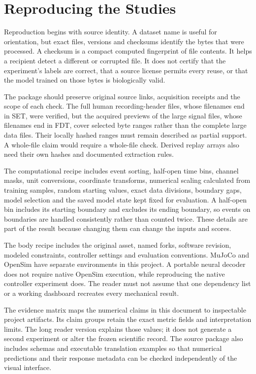 \section{Reproducing the Studies}

Reproduction begins with source identity. A dataset name is useful for orientation, but exact files, versions and checksums identify the bytes that were processed. A checksum is a compact computed fingerprint of file contents. It helps a recipient detect a different or corrupted file. It does not certify that the experiment's labels are correct, that a source license permits every reuse, or that the model trained on those bytes is biologically valid.

The package should preserve original source links, acquisition receipts and the scope of each check. The full human recording-header files, whose filenames end in SET, were verified, but the acquired previews of the large signal files, whose filenames end in FDT, cover selected byte ranges rather than the complete large data files. Their locally hashed ranges must remain described as partial support. A whole-file claim would require a whole-file check. Derived replay arrays also need their own hashes and documented extraction rules.\cite{spinal_dataset2023,spinal_companion2023}

The computational recipe includes event sorting, half-open time bins, channel masks, unit conversions, coordinate transforms, numerical scaling calculated from training samples, random starting values, exact data divisions, boundary gaps, model selection and the saved model state kept fixed for evaluation. A half-open bin includes its starting boundary and excludes its ending boundary, so events on boundaries are handled consistently rather than counted twice. These details are part of the result because changing them can change the inputs and scores.

The body recipe includes the original asset, named forks, software revision, modeled constraints, controller settings and evaluation conventions. MuJoCo and OpenSim have separate environments in this project. A portable neural decoder does not require native OpenSim execution, while reproducing the native controller experiment does. The reader must not assume that one dependency list or a working dashboard recreates every mechanical result.\cite{mujoco2012,opensim2018,myosim2026,limblabmodel2026}

The evidence matrix maps the numerical claims in this document to inspectable project artifacts. Its claim groups retain the exact metric fields and interpretation limits. The long reader version explains those values; it does not generate a second experiment or alter the frozen scientific record. The source package also includes schemas and executable translation examples so that numerical predictions and their response metadata can be checked independently of the visual interface.

